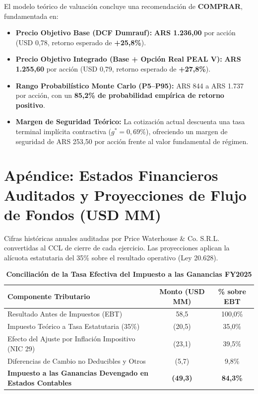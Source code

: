 \documentclass[10pt,a4paper]{article}
\begin{document}
El modelo teórico de valuación concluye una recomendación de \textbf{COMPRAR}, fundamentada en:
\begin{itemize}
    \item \textbf{Precio Objetivo Base (DCF Dumrauf):} \textbf{ARS 1.236,00} por acción (USD 0,78, retorno esperado de \textbf{+25,8\%}).
    \item \textbf{Precio Objetivo Integrado (Base + Opción Real PEAL V):} \textbf{ARS 1.255,60} por acción (USD 0,79, retorno esperado de \textbf{+27,8\%}).
    \item \textbf{Rango Probabilístico Monte Carlo (P5--P95):} ARS 844 a ARS 1.737 por acción, con un \textbf{85,2\% de probabilidad empírica de retorno positivo}.
    \item \textbf{Margen de Seguridad Teórico:} La cotización actual descuenta una tasa terminal implícita contractiva ($g^* = 0,69\%$), ofreciendo un margen de seguridad de ARS 253,50 por acción frente al valor fundamental de régimen.
\end{itemize}

\clearpage

\section*{Apéndice: Estados Financieros Auditados y Proyecciones de Flujo de Fondos (USD MM)}

{\small Cifras históricas anuales auditadas por Price Waterhouse \& Co. S.R.L. convertidas al CCL de cierre de cada ejercicio. Las proyecciones aplican la alícuota estatutaria del 35\% sobre el resultado operativo (Ley 20.628).}

\begin{table}[H]
\centering
\caption{\textbf{Conciliación de la Tasa Efectiva del Impuesto a las Ganancias FY2025}}
\small
\begin{tabularx}{\textwidth}{Xcc}
\toprule
\textbf{Componente Tributario} & \textbf{Monto (USD MM)} & \textbf{\% sobre EBT} \\
\midrule
Resultado Antes de Impuestos (EBT) & 58,5 & 100,0\% \\
Impuesto Teórico a Tasa Estatutaria (35\%) & (20,5) & 35,0\% \\
Efecto del Ajuste por Inflación Impositivo (NIC 29) & (23,1) & 39,5\% \\
Diferencias de Cambio no Deducibles y Otros & (5,7) & 9,8\% \\
\midrule
\textbf{Impuesto a las Ganancias Devengado en Estados Contables} & \textbf{(49,3)} & \textbf{84,3\%} \\
\bottomrule
\end{tabularx}
\end{table}
\end{document}

